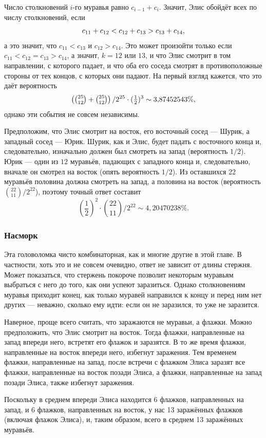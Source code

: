 Число столкновений $i$-го муравья равно $c_{i-1}+c_{i}$.
Значит, Элис обойдёт всех по числу столкновений, если 
\[c_{11}+c_{12}\z<c_{12}\z+c_{13}\z>c_{13}\z+c_{14},\]
а это значит, что  $c_{11}<c_{13}$ и $c_{12}>c_{14}$.
Это может произойти только если 
$c_{11}<c_{12}=c_{13}>c_{14}$,
а значит,  $k = 12$ или $13$, и что Элис смотрит в том направлении, с которого падает,
и что оба его соседа смотрят в противоположные стороны от тех концов, с которых они падают.
На первый взгляд кажется, что это даёт вероятность 
\[\left(\tbinom{25}{12}+\tbinom{25}{12}\right)/2^{25}\cdot (\tfrac12)^3\sim 3{,}87452543\%,\]
однако эти события не совсем независимы.

Предположим, что Элис смотрит на восток, его восточный сосед --- Шурик, а западный сосед --- Юрик.
Шурик, как и Элис, будет падать с восточного конца и, следовательно, изначально должен был смотреть на запад (вероятность $1/2$).
Юрик --- один из $12$ муравьёв, падающих с западного конца и, следовательно, вначале он смотрел на восток (опять вероятность $1/2$).
Из оставшихся 22 муравьёв половина должна смотреть на запад, а половина на восток (вероятность $\binom{22}{11}/2^{22}$), поэтому точный ответ составит
\[\left(\frac12\right)^2\cdot\binom{22}{11}/2^{22}\sim 4{,}20470238\%.\]

\subsubsection*{Насморк}

Эта головоломка чисто комбинаторная, как и многие другие в этой главе.
В частности, хоть это и не совсем очевидно, ответ не зависит от длины стержня.
Может показаться, что стержень покороче позволит некоторым муравьям выбраться с него до того, как они успеют заразиться.
Однако столкновениям муравья приходит конец, как только муравей направился к концу и перед ним нет других --- неважно, сколько ему идти: если он не заразился, то уже не заразится.

Наверное, проще всего считать, что заражаются не муравьи, а флажки.
Можно предположить, что Элис смотрит на восток.
Тогда флажки, направленные на запад впереди него, встретят его флажок и заразятся.
В то же время флажки, направленные на восток впереди него, избегнут заражения.
Тем временем флажки, направленные на запад, после встречи с флажком Элиса заразят все флажки, направленные на восток позади Элиса, а флажки, направленные на запад позади Элиса, также избегнут заражения.

Поскольку в среднем впереди Элиса находится 6 флажков, направленных на запад, и 6 флажков, направленных на восток, у нас 13 заражённых флажков (включая флажок Элиса), и, таким образом, всего в среднем 13 заражённых муравьёв.

